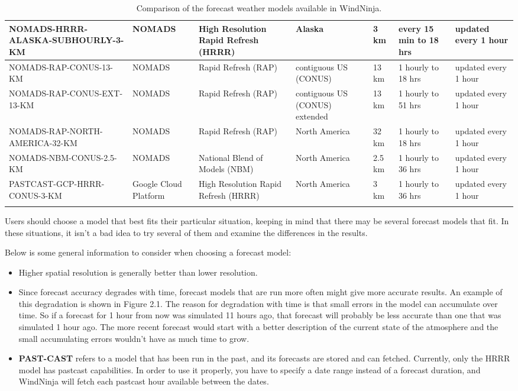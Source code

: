 \documentclass[12pt]{article}
\begin{document}
\begin{landscape}
\begin{longtable}[1]{|p{4.0cm}|p{2.0cm}|p{2.2cm}|p{2.0cm}|p{2.2cm}|p{3.4cm}|p{3.6cm}|}
\hline
NOMADS-HRRR-ALASKA-SUBHOURLY-3-KM & NOMADS & High Resolution Rapid Refresh (HRRR) & Alaska & 3 km & every 15 min to 18 hrs & updated every 1 hour\\
\hline
NOMADS-RAP-CONUS-13-KM & NOMADS & Rapid Refresh (RAP) & contiguous US (CONUS) & 13 km & 1 hourly to 18 hrs & updated every 1 hour\\
\hline
NOMADS-RAP-CONUS-EXT-13-KM & NOMADS & Rapid Refresh (RAP) & contiguous US (CONUS) extended & 13 km & 1 hourly to 51 hrs & updated every 1 hour\\
\hline
NOMADS-RAP-NORTH-AMERICA-32-KM & NOMADS & Rapid Refresh (RAP) & North America & 32 km & 1 hourly to 18 hrs & updated every 1 hour\\
\hline
NOMADS-NBM-CONUS-2.5-KM & NOMADS & National Blend of Models (NBM) & North America & 2.5 km & 1 hourly to 36 hrs & updated every 1 hour\\
\hline
PASTCAST-GCP-HRRR-CONUS-3-KM & Google Cloud Platform & High Resolution Rapid Refresh (HRRR) & North America & 3 km & 1 hourly to 36 hrs & updated every 1 hour\\
\hline
\caption{Comparison of the forecast weather models available in WindNinja.}
\end{longtable}
\end{landscape}

Users should choose a model that best fits their particular situation, keeping in mind that there may be several forecast models that fit.  
In these situations, it isn't a bad idea to try several of them and examine the differences in the results.

Below is some general information to consider when choosing a forecast model:
\begin{itemize}
\item Higher spatial resolution is generally better than lower resolution.
\item Since forecast accuracy degrades with time, forecast models that are run more often might give more accurate results.  
An example of this degradation is shown in Figure 2.1.  The reason for degradation with time is that small errors in the model can accumulate over time.  
So if a forecast for 1 hour from now was simulated 11 hours ago, that forecast will probably be less accurate than one that was simulated 1 hour ago.  
The more recent forecast would start with a better description of the current state of the atmosphere and the small accumulating errors wouldn't have as much time to grow.
\item \textbf{PAST-CAST} refers to a model that has been run in the past, and its forecasts are stored and can fetched. 
Currently, only the HRRR model has pastcast capabilities. In order to use it properly, you have to specify a date range instead of a forecast duration, and WindNinja will fetch each pastcast hour available between the dates. 
\end{itemize}
\end{document}

